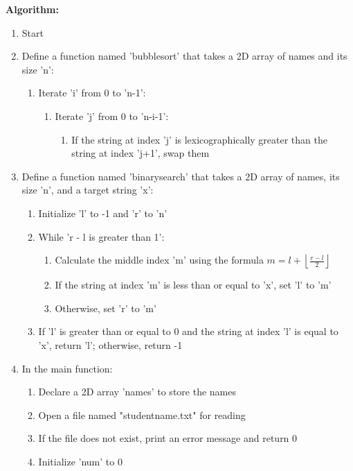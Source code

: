 \documentclass{article}
\begin{document}
\textbf{Algorithm:}
\begin{enumerate}
  \item Start
  \item Define a function named 'bubblesort' that takes a 2D array of names and its size 'n':
    \begin{enumerate}
      \item Iterate 'i' from 0 to 'n-1':
        \begin{enumerate}
          \item Iterate 'j' from 0 to 'n-i-1':
            \begin{enumerate}
              \item If the string at index 'j' is lexicographically greater than the string at index 'j+1', swap them
            \end{enumerate}
        \end{enumerate}
    \end{enumerate}
  \item Define a function named 'binarysearch' that takes a 2D array of names, its size 'n', and a target string 'x':
    \begin{enumerate}
      \item Initialize 'l' to -1 and 'r' to 'n'
      \item While 'r - l is greater than 1':
        \begin{enumerate}
          \item Calculate the middle index 'm' using the formula \(m = l + \left\lfloor\frac{r - l}{2}\right\rfloor\)
          \item If the string at index 'm' is less than or equal to 'x', set 'l' to 'm'
          \item Otherwise, set 'r' to 'm'
        \end{enumerate}
      \item If 'l' is greater than or equal to 0 and the string at index 'l' is equal to 'x', return 'l'; otherwise, return -1
    \end{enumerate}
  \item In the main function:
    \begin{enumerate}
      \item Declare a 2D array 'names' to store the names
      \item Open a file named "studentname.txt" for reading
      \item If the file does not exist, print an error message and return 0
      \item Initialize 'num' to 0

\end{enumerate}
\end{enumerate}
\end{document}
